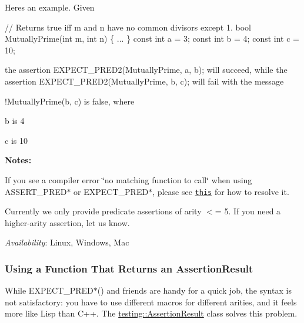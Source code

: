 Here\textquotesingle{}s an example. Given


\begin{DoxyCode}
// Returns true iff m and n have no common divisors except 1.
bool MutuallyPrime(int m, int n) \{ ... \}
const int a = 3;
const int b = 4;
const int c = 10;
\end{DoxyCode}


the assertion {\ttfamily E\+X\+P\+E\+C\+T\+\_\+\+P\+R\+E\+D2(\+Mutually\+Prime, a, b);} will succeed, while the assertion {\ttfamily E\+X\+P\+E\+C\+T\+\_\+\+P\+R\+E\+D2(\+Mutually\+Prime, b, c);} will fail with the message


\begin{DoxyPre}
!MutuallyPrime(b, c) is false, where~\newline

b is 4~\newline

c is 10~\newline

\end{DoxyPre}


{\bfseries Notes\+:}


\begin{DoxyEnumerate}
\item If you see a compiler error \char`\"{}no matching function to call\char`\"{} when using {\ttfamily A\+S\+S\+E\+R\+T\+\_\+\+P\+R\+E\+D$\ast$} or {\ttfamily E\+X\+P\+E\+C\+T\+\_\+\+P\+R\+E\+D$\ast$}, please see \href{V1_5_FAQ.md#the-compiler-complains-about-undefined-references-to-some-static-const-member-variables-but-i-did-define-them-in-the-class-body-whats-wrong}{\tt this} for how to resolve it.
\end{DoxyEnumerate}
\begin{DoxyEnumerate}
\item Currently we only provide predicate assertions of arity $<$= 5. If you need a higher-\/arity assertion, let us know.
\end{DoxyEnumerate}

{\itshape Availability}\+: Linux, Windows, Mac

\subsubsection*{Using a Function That Returns an Assertion\+Result}

While {\ttfamily E\+X\+P\+E\+C\+T\+\_\+\+P\+R\+E\+D$\ast$()} and friends are handy for a quick job, the syntax is not satisfactory\+: you have to use different macros for different arities, and it feels more like Lisp than C++. The {\ttfamily \hyperlink{classtesting_1_1_assertion_result}{testing\+::\+Assertion\+Result}} class solves this problem.

